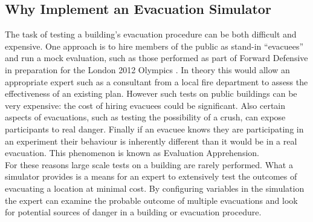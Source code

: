 \subsection{Why Implement an Evacuation Simulator}
The task of testing a building's evacuation procedure can be
both difficult and expensive. One approach is to hire members of the public
as stand-in ``evacuees'' and run a mock evaluation, such as those performed as part of Forward Defensive
in preparation for the London 2012 Olympics \cite{DailyMailEvacuation}. In theory this would allow an 
appropriate expert such as a consultant from a local fire department to assess the effectiveness
of an existing plan. However such tests on public buildings can be very expensive: the cost
of hiring evacuees could be significant. Also certain aspects of evacuations, such
as testing the possibility of a crush, can expose participants
to real danger. Finally if an evacuee knows they are participating in an experiment
their behaviour is inherently different than it would be in a real evacuation. This
phenomenon is known as Evaluation Apprehension\cite{EvalApprehension}.\\
For these reasons large scale tests on a building are rarely performed.
What a simulator provides is a means for an expert to extensively test the outcomes of evacuating a location
at minimal cost. By configuring variables in the simulation the expert can examine the probable outcome of multiple evacuations
and look for potential sources of danger in a building or evacuation procedure.

